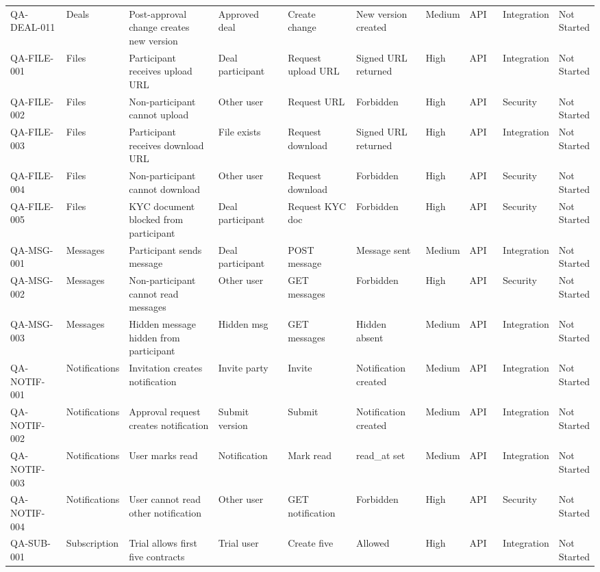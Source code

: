 \begin{longtable}{p{0.12\linewidth}p{0.1\linewidth}p{0.22\linewidth}p{0.14\linewidth}p{0.14\linewidth}p{0.14\linewidth}p{0.07\linewidth}p{0.08\linewidth}p{0.1\linewidth}p{0.08\linewidth}}
QA-DEAL-011 & Deals & Post-approval change creates new version & Approved deal & Create change & New version created & Medium & API & Integration & Not Started \\
QA-FILE-001 & Files & Participant receives upload URL & Deal participant & Request upload URL & Signed URL returned & High & API & Integration & Not Started \\
QA-FILE-002 & Files & Non-participant cannot upload & Other user & Request URL & Forbidden & High & API & Security & Not Started \\
QA-FILE-003 & Files & Participant receives download URL & File exists & Request download & Signed URL returned & High & API & Integration & Not Started \\
QA-FILE-004 & Files & Non-participant cannot download & Other user & Request download & Forbidden & High & API & Security & Not Started \\
QA-FILE-005 & Files & KYC document blocked from participant & Deal participant & Request KYC doc & Forbidden & High & API & Security & Not Started \\
QA-MSG-001 & Messages & Participant sends message & Deal participant & POST message & Message sent & Medium & API & Integration & Not Started \\
QA-MSG-002 & Messages & Non-participant cannot read messages & Other user & GET messages & Forbidden & High & API & Security & Not Started \\
QA-MSG-003 & Messages & Hidden message hidden from participant & Hidden msg & GET messages & Hidden absent & Medium & API & Integration & Not Started \\
QA-NOTIF-001 & Notifications & Invitation creates notification & Invite party & Invite & Notification created & Medium & API & Integration & Not Started \\
QA-NOTIF-002 & Notifications & Approval request creates notification & Submit version & Submit & Notification created & Medium & API & Integration & Not Started \\
QA-NOTIF-003 & Notifications & User marks read & Notification & Mark read & read\_at set & Medium & API & Integration & Not Started \\
QA-NOTIF-004 & Notifications & User cannot read other notification & Other user & GET notification & Forbidden & High & API & Security & Not Started \\
QA-SUB-001 & Subscription & Trial allows first five contracts & Trial user & Create five & Allowed & High & API & Integration & Not Started \\

\end{longtable}
